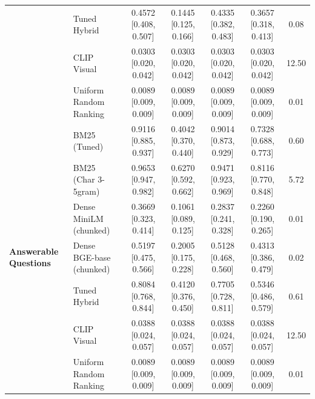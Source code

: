 \documentclass[conference]{IEEEtran}
\begin{document}
\begin{table}[t]
{\begin{tabular}{llccccc}
 & Tuned Hybrid            & 0.4572 [0.408, 0.507] & 0.1445 [0.125, 0.166] & 0.4335 [0.382, 0.483] & 0.3657 [0.318, 0.413] & 0.08 \\
 & CLIP Visual             & 0.0303 [0.020, 0.042] & 0.0303 [0.020, 0.042] & 0.0303 [0.020, 0.042] & 0.0303 [0.020, 0.042] & 12.50 \\
 & Uniform Random Ranking  & 0.0089 [0.009, 0.009] & 0.0089 [0.009, 0.009] & 0.0089 [0.009, 0.009] & 0.0089 [0.009, 0.009] & 0.01 \\
\midrule
\multirow{7}{*}{\textbf{Answerable Questions}}
 & BM25 (Tuned)            & 0.9116 [0.885, 0.937] & 0.4042 [0.370, 0.440] & 0.9014 [0.873, 0.929] & 0.7328 [0.688, 0.773] & 0.60 \\
 & BM25 (Char 3-5gram)     & 0.9653 [0.947, 0.982] & 0.6270 [0.592, 0.662] & 0.9471 [0.923, 0.969] & 0.8116 [0.770, 0.848] & 5.72 \\
 & Dense MiniLM (chunked)  & 0.3669 [0.323, 0.414] & 0.1061 [0.089, 0.125] & 0.2837 [0.241, 0.328] & 0.2260 [0.190, 0.265] & 0.01 \\
 & Dense BGE-base (chunked)& 0.5197 [0.475, 0.566] & 0.2005 [0.175, 0.228] & 0.5128 [0.468, 0.560] & 0.4313 [0.386, 0.479] & 0.02 \\
 & Tuned Hybrid            & 0.8084 [0.768, 0.844] & 0.4120 [0.376, 0.450] & 0.7705 [0.728, 0.811] & 0.5346 [0.486, 0.579] & 0.61 \\
 & CLIP Visual             & 0.0388 [0.024, 0.057] & 0.0388 [0.024, 0.057] & 0.0388 [0.024, 0.057] & 0.0388 [0.024, 0.057] & 12.50 \\
 & Uniform Random Ranking  & 0.0089 [0.009, 0.009] & 0.0089 [0.009, 0.009] & 0.0089 [0.009, 0.009] & 0.0089 [0.009, 0.009] & 0.01 \\
\bottomrule
\end{tabular}}
\end{table}
\end{document}
